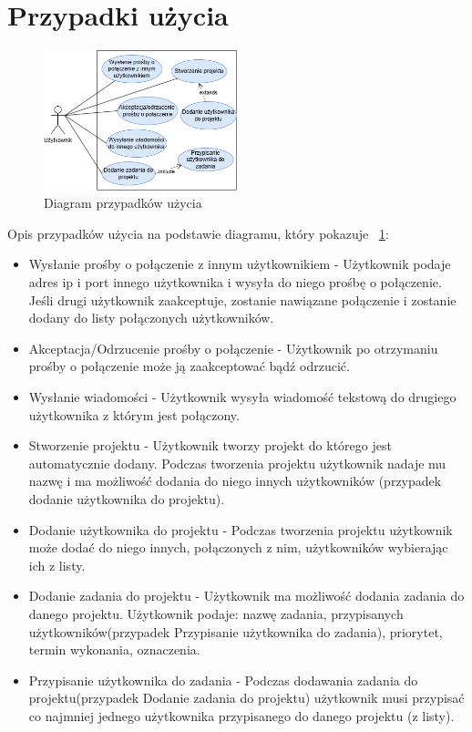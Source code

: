 \section{Przypadki użycia}
\label{sec:PrzypadkiUzycia}
\begin{figure}[!ht]
	\centering
		\includegraphics[width=0.5\textwidth]{Images/PrzypadkiUzycia.png}
	\caption{Diagram przypadków użycia}
	\label{fig:PrzypadkiUzycia}
\end{figure}
Opis przypadków użycia na podstawie diagramu, który pokazuje \figurename{~\ref{fig:PrzypadkiUzycia}}:
\begin{itemize}
\item {Wysłanie prośby o połączenie z innym użytkownikiem} - Użytkownik podaje adres ip i port innego użytkownika i wysyła do niego prośbę o połączenie. Jeśli drugi użytkownik zaakceptuje, zostanie nawiązane połączenie i zostanie dodany do listy połączonych użytkowników.
\item {Akceptacja/Odrzucenie prośby o połączenie} - Użytkownik po otrzymaniu prośby o połączenie może ją zaakceptować bądź odrzucić.
\item {Wysłanie wiadomości} - Użytkownik wysyła wiadomość tekstową do drugiego użytkownika z którym jest połączony.
\item {Stworzenie projektu} - Użytkownik tworzy projekt do którego jest automatycznie dodany. Podczas tworzenia projektu użytkownik nadaje mu nazwę i ma możliwość dodania do niego innych użytkowników (przypadek dodanie użytkownika do projektu).
\item {Dodanie użytkownika do projektu} - Podczas tworzenia projektu użytkownik może dodać do niego innych, połączonych z nim, użytkowników wybierając ich z listy.
\item {Dodanie zadania do projektu} - Użytkownik ma możliwość dodania zadania do danego projektu. Użytkownik podaje: nazwę zadania, przypisanych użytkowników(przypadek Przypisanie użytkownika do zadania), priorytet, termin wykonania, oznaczenia.
\item {Przypisanie użytkownika do zadania} - Podczas dodawania zadania do projektu(przypadek Dodanie zadania do projektu) użytkownik musi przypisać co najmniej jednego użytkownika przypisanego do danego projektu (z listy).
\end{itemize}

